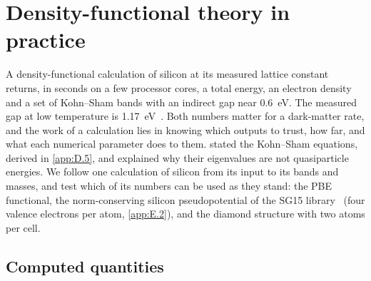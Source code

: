 \section{Density-functional theory in practice}\label{app:E.1}

A density-functional calculation of silicon at its measured lattice constant returns, in seconds on a few processor cores, a total energy, an electron density and a set of Kohn--Sham bands with an indirect gap near \SI{0.6}{eV}. The measured gap at low temperature is \SI{1.17}{eV}~\cite[Eq.~(11)]{ramanathan2020ionization}. Both numbers matter for a dark-matter rate, and the work of a calculation lies in knowing which outputs to trust, how far, and what each numerical parameter does to them.  stated the Kohn--Sham equations, derived in \cref{app:D.5}, and explained why their eigenvalues are not quasiparticle energies. We follow one calculation of silicon from its input to its bands and masses, and test which of its numbers can be used as they stand: the PBE functional, the norm-conserving silicon pseudopotential of the SG15 library~\cite{schlipf2015optimization} (four valence electrons per atom, \cref{app:E.2}), and the diamond structure with two atoms per cell.

\subsection{Computed quantities}

